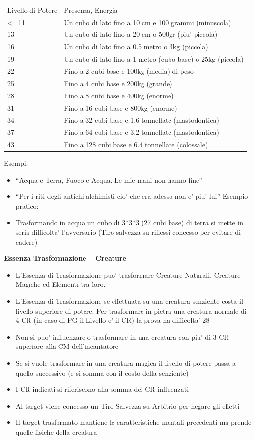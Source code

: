 \documentclass[a4paper,11pt,twoside,openany]{dndbook}
\begin{document}
\bigskip

\begin{tabular}[c]{@{}ll@{}}
\toprule 
Livello di Potere & Presenza, Energia\tabularnewline
\textless=11 & Un cubo di lato fino a 10 cm e 100 grammi (minuscola)\tabularnewline
13 & Un cubo di lato fino a 20 cm o 500gr (piu' piccola)\tabularnewline
16 & Un cubo di lato fino a 0.5 metro o 3kg (piccola)\tabularnewline
19 & Un cubo di lato fino a 1 metro (cubo base) o 25kg (piccola)\tabularnewline
22 & Fino a 2 cubi base e 100kg (media) di peso\tabularnewline
25 & Fino a 4 cubi base e 200kg (grande)\tabularnewline
28 & Fino a 8 cubi base e 400kg (enorme)\tabularnewline
31 & Fino a 16 cubi base e 800kg (enorme)\tabularnewline
34 & Fino a 32 cubi base e 1.6 tonnellate (mastodontica)\tabularnewline
37 & Fino a 64 cubi base e 3.2 tonnellate (mastodontica)\tabularnewline
43 & Fino a 128 cubi base e 6.4 tonnellate (colossale)\tabularnewline
\bottomrule
\end{tabular}

Esempi:
\begin{itemize}
\item 
``Acqua e Terra, Fuoco e Acqua. Le mie mani non hanno fine'' 
\item 
``Per i riti degli antichi alchimisti cio' che era adesso non e'
piu' lui'' 
Esempio pratico:
\item 
Trasformando in acqua un cubo di 3{*}3{*}3 (27 cubi base) di terra si mette in seria difficolta' l'avversario (Tiro salvezza su riflessi concesso per evitare di cadere) 
\end{itemize}

\bigskip

\textbf{Essenza Trasformazione -- Creature}

\begin{itemize}
\item 
L'Essenza di Trasformazione puo' trasformare Creature Naturali, Creature Magiche ed Elementi tra loro. 
\item 
L'Essenza di Trasformazione se effettuata su una creatura senziente costa il livello superiore di potere. Per trasformare in pietra una creatura normale di 4 CR (in caso di PG il Livello e' il CR) la prova ha difficolta' 28 
\item 
Non si puo' influenzare o trasformare in una creatura con piu' di 3 CR superiore alla CM dell'incantatore 
\item 
Se si vuole trasformare in una creatura magica il livello di potere passa a quello successivo (e si somma con il costo della senziente) 
\item 
I CR indicati si riferiscono alla somma dei CR influenzati 
\item 
Al target viene concesso un Tiro Salvezza su Arbitrio per negare gli effetti 
\item 
Il target trasformato mantiene le caratteristiche mentali precedenti
ma prende quelle fisiche della creatura 
\end{itemize}
\end{document}
